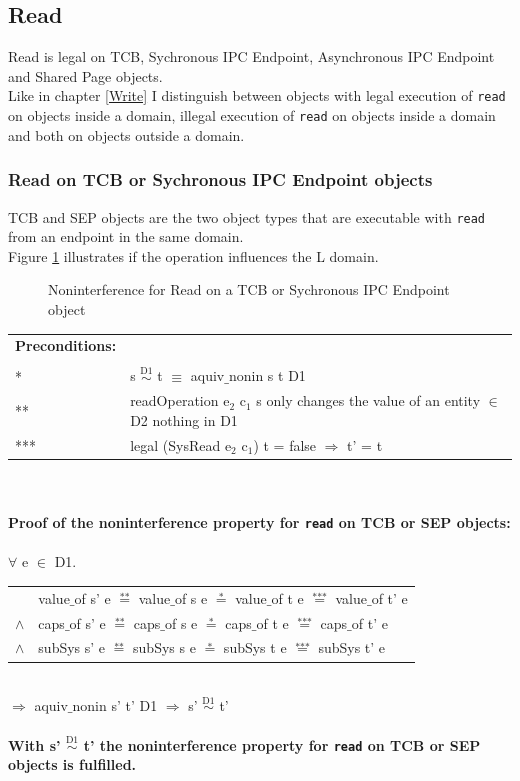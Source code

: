 \documentclass[11pt,a4paper,twoside]{article}
\begin{document}
{\subsection{Read}\label{sec:Read}
Read is legal on TCB, Sychronous IPC Endpoint, Asynchronous IPC Endpoint and Shared Page objects. \\
Like in chapter \ref{Write} I distinguish between objects with legal execution of \texttt{read} on objects inside a domain, illegal execution of \texttt{read} on objects inside a domain and both on objects outside a domain.
\subsubsection{Read on TCB or Sychronous IPC Endpoint objects}
TCB and SEP objects are the two object types that are executable with \texttt{read} from an endpoint in the same domain. \\
Figure \ref{fig:ReadTCB} illustrates if the operation influences the L domain.
\begin{flushleft}
\begin{figure}[H]
\caption{Noninterference for Read on a TCB or Sychronous IPC Endpoint object}
\label{fig:ReadTCB}
\end{figure}
\end{flushleft}
\begin{tabular}{ll}
\textbf{Preconditions:} \\ \\
* & s $\overset{\text{D1}}{\sim}$ t $\equiv$ aquiv$\_$nonin s t D1	\\ 
** & readOperation e$_2$ c$_1$ s only changes the value of an entity $\in$ D2 nothing in D1 \\ 
*** & legal (SysRead e$_2$ c$_1$) t = false $\Rightarrow$ t' = t
\end{tabular} \\ \\ 
\textbf{Proof of the noninterference property for \texttt{read} on TCB or SEP objects:}\\ \\
$\forall$ e $\in$ D1. \\ 
\begin{tabular}{ll}
& value$\_$of s' e $\overset{\text{**}}{=}$ value$\_$of s e $\overset{\text{*}}{=}$ value$\_$of t e $\overset{\text{***}}{=}$ value$\_$of t' e \\
$\wedge$ & caps$\_$of s' e $\overset{\text{**}}{=}$ caps$\_$of s e $\overset{\text{*}}{=}$ caps$\_$of t e $\overset{\text{***}}{=}$ caps$\_$of t' e \\
$\wedge$ & subSys s' e $\overset{\text{**}}{=}$ subSys s e $\overset{\text{*}}{=}$ subSys t e $\overset{\text{***}}{=}$ subSys t' e
\end{tabular} \\
$\Rightarrow$ aquiv$\_$nonin s' t' D1 $\Rightarrow$ s' $\overset{\text{D1}}{\sim}$ t' \\ \\
\textbf{With s' $\overset{\text{D1}}{\sim}$ t' the noninterference property for \texttt{read} on TCB or SEP objects is fulfilled.}  
\clearpage
}
\end{document}
